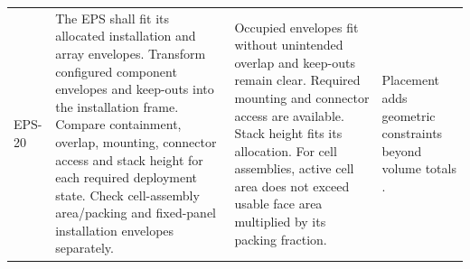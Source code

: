 \begin{longtable}{@{}P{0.09\ReportTableBodyWidth}P{0.37\ReportTableBodyWidth}P{0.29\ReportTableBodyWidth}P{0.25\ReportTableBodyWidth}@{}}
EPS-20\label{epsreq:EPS-20} & The EPS shall fit its allocated installation and array envelopes. Transform configured component envelopes and keep-outs into the installation frame. Compare containment, overlap, mounting, connector access and stack height for each required deployment state. Check cell-assembly area/packing and fixed-panel installation envelopes separately. & Occupied envelopes fit without unintended overlap and keep-outs remain clear. Required mounting and connector access are available. Stack height fits its allocation. For cell assemblies, active cell area does not exceed usable face area multiplied by its packing fraction. & Placement adds geometric constraints beyond volume totals \citep[Sec.~2.3]{review-0711}. \\
\end{longtable}
\endgroup
